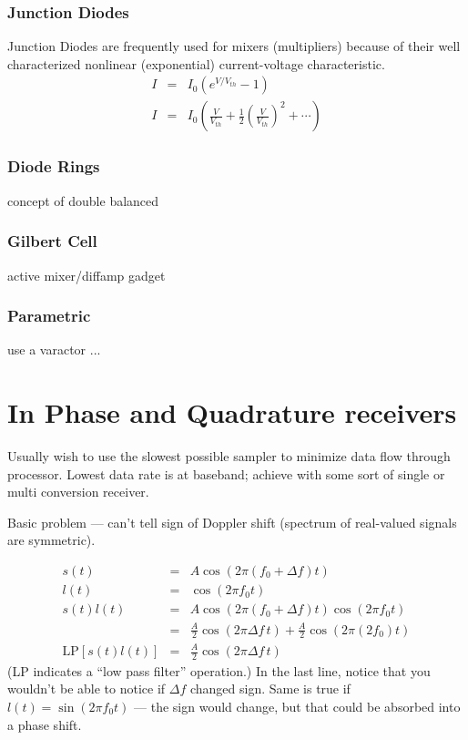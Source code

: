 \subsubsection{Junction Diodes}

Junction Diodes are frequently used for mixers (multipliers) because
of their well characterized nonlinear (exponential) current-voltage
characteristic.
\begin{eqnarray}
I &=& I_0\left( e^{V/V_{th}} - 1 \right) \\
I &=& I_0\left(\frac{V}{V_{th}}
+ \frac{1}{2}\left(\frac{V}{V_{th}}\right)^2 + \cdots \right)
\end{eqnarray}

\subsubsection{Diode Rings}

concept of double balanced

\subsubsection{Gilbert Cell}

active mixer/diffamp gadget

\subsubsection{Parametric}

use a varactor ...

\section{In Phase and Quadrature receivers}

Usually wish to use the slowest possible sampler to minimize data flow
through processor.  Lowest data rate is at baseband; achieve with some
sort of single or multi conversion receiver.

Basic problem --- can't tell sign of Doppler shift (spectrum of
real-valued signals are symmetric).

\begin{eqnarray}
s(t) &=& A \cos(2\pi(f_0 + \Delta f)t) \\
l(t) &=& \cos(2\pi f_0 t) \\
s(t)l(t) &=& A \cos(2\pi(f_0 + \Delta f)t)\cos(2\pi f_0 t) \\
&=& \frac{A}{2}\cos(2\pi \Delta f \,t) + \frac{A}{2}\cos(2\pi (2f_0)
t) \\
\textrm{LP}[s(t)l(t)] &=& \frac{A}{2}\cos(2\pi \Delta f \,t)
\end{eqnarray}
(LP indicates a ``low pass filter'' operation.)  In the last line,
notice that you wouldn't be able to notice if $\Delta f$ changed sign.
Same is true if $l(t) = \sin(2\pi f_0 t)$ --- the sign would change,
but that could be absorbed into a phase shift.

